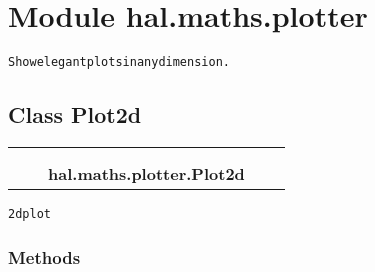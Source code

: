 %
%
%


\section{Module hal.maths.plotter}

    \label{hal:maths:plotter}
\begin{alltt}
Show elegant plots in any dimension. 
\end{alltt}



\subsection{Class Plot2d}

    \label{hal:maths:plotter:Plot2d}
\begin{tabular}{cccccc}
\multicolumn{2}{r}{\settowidth{\BCL}{object}\multirow{2}{\BCL}{object}}
&&
  \\\cline{3-3}
  &&\multicolumn{1}{c|}{}
&&
  \\
&&\multicolumn{2}{l}{\textbf{hal.maths.plotter.Plot2d}}
\end{tabular}

\begin{alltt}
2d plot 
\end{alltt}



  \subsubsection{Methods}

